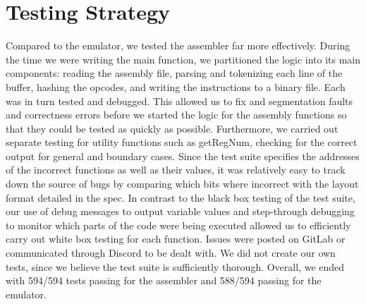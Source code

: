 \documentclass[11pt]{article}
\begin{document}
\section{Testing Strategy}
Compared to the emulator, we tested the assembler far more effectively. During the time we were writing the main function, we partitioned the logic into its main components: reading the assembly file, parsing and tokenizing each line of the buffer, hashing the opcodes, and writing the instructions to a binary file. Each was in turn tested and debugged. This allowed us to fix and segmentation faults and correctness errors before we started the logic for the assembly functions so that they could be tested as quickly as possible. Furthermore, we carried out separate testing for utility functions such as getRegNum, checking for the correct output for general and boundary cases. Since the test suite specifies the addresses of the incorrect functions as well as their values, it was relatively easy to track down the source of bugs by comparing which bits where incorrect with the layout format detailed in the spec. In contrast to the black box testing of the test suite, our use of debug messages to output variable values and step-through debugging to monitor which parts of the code were being executed allowed us to efficiently carry out white box testing for each function. Issues were posted on GitLab or communicated through Discord to be dealt with. We did not create our own tests, since we believe the test suite is sufficiently thorough. Overall, we ended with 594/594 tests passing for the assembler and 588/594 passing for the emulator. 

\pagebreak
\end{document}
